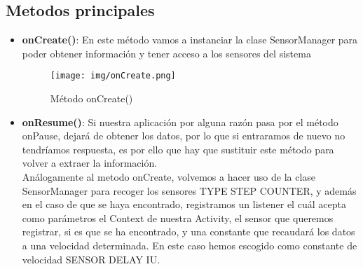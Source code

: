 \documentclass[12pt, a4paper, titlepage]{article}
\begin{document}
    	\subsection{Metodos principales}
    	\begin{itemize}
    		\item \textbf{onCreate()}: En este método vamos a instanciar la clase SensorManager para poder obtener información y tener acceso a los sensores del sistema\newline\\

    		\begin{figure}[h!]
    			\begin{center}
    				\texttt{[image: img/onCreate.png]}
    				\caption{Método onCreate()}
    			\end{center}
    		\end{figure}
    		\item \textbf{onResume()}: Si nuestra aplicación por alguna razón pasa por el método onPause, dejará de obtener los datos, por lo que si entraramos de nuevo no tendríamos respuesta, es por ello que hay que sustituir este método para volver a extraer la información.\newline\\
    		Análogamente al metodo onCreate, volvemos a hacer uso de la clase SensorManager para recoger los sensores TYPE STEP COUNTER, y además en el caso de que se haya encontrado, registramos un listener el cuál acepta como parámetros el Context de nuestra Activity, el sensor que queremos registrar, si es que se ha encontrado, y una constante que recaudará los datos a una velocidad determinada. En este caso hemos escogido como constante de velocidad SENSOR DELAY IU. \newline\\


\end{itemize}
\end{document}
